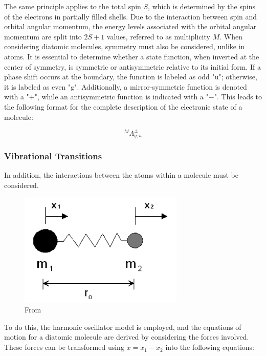 \documentclass{article}
\begin{document}
The same principle applies to the total spin $S$, which is determined by the spins of the electrons in partially filled shells. Due to the interaction between spin and orbital angular momentum, the energy levels associated with the orbital angular momentum are split into $2S + 1$ values, referred to as multiplicity $M$. 
When considering diatomic molecules, symmetry must also be considered, unlike in atoms. It is essential to determine whether a state function, when inverted at the center of symmetry, is symmetric or antisymmetric relative to its initial form. If a phase shift occurs at the boundary, the function is labeled as odd "u"; otherwise, it is labeled as even "g". 
Additionally, a mirror-symmetric function is denoted with a "$+$", while an antisymmetric function is indicated with a "$-$". This leads to the following format for the complete description of the electronic state of a molecule:

\begin{equation*}
	\label{eq:state}
	^{M}\Lambda_{g,u}^{\pm}
\end{equation*}

\subsubsection{Vibrational Transitions}

In addition, the interactions between the atoms within a molecule must be considered.

\begin{figure}[h!]
	\centering
	\includegraphics[width=0.7\textwidth]{Figures/Introduction/Oscillator.jpg}
	\caption{From \cite{riede_optical}}
\end{figure}


To do this, the harmonic oscillator model is employed, and the equations of motion for a diatomic molecule are derived by considering the forces involved. These forces can be transformed using $x = x_1 - x_2$ into the following equations:
\end{document}
